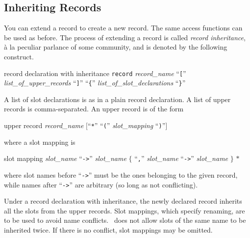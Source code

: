 \documentclass[a4paper]{memoir}
\begin{document}
\subsection{Inheriting Records}\label{sec:p2-record-inheritance}

You can extend a record to create a new record.
The same access functions can be used as before.
The process of extending a record is called
{\em record inheritance},
{\` a} la peculiar parlance of some community, and
is denoted by the following construct.

\begin{bsyntax} record declaration with inheritance  \Hline
\texttt{record} \textit{record\_name} ``\texttt{[}'' \textit{list\_of\_upper\_records} ``\texttt{]}'' ``\texttt{\{}'' \textit{list\_of\_slot\_declarations} ``\texttt{\}}''
\end{bsyntax}

A list of slot declarations is as in a plain record declaration.
A list of upper records is comma-separated. An upper record is of
the form

\begin{bsyntax} upper record \Hline
\textit{record\_name} $[$``\texttt{*}'' ``\texttt{(}'' \textit{slot\_mapping} ``\texttt{)}''$]$
\end{bsyntax}

where a slot mapping is

\begin{bsyntax} slot mapping \Hline
\textit{slot\_name} ``\texttt{->}'' \textit{slot\_name} $\{$ ``\texttt{,}'' \textit{slot\_name} ``\texttt{->}'' \textit{slot\_name} $\}$ $*$
\end{bsyntax}

where slot names before ``\verb|->|'' must be the ones belonging to the
given record, while names after ``\verb|->|'' are arbitrary (so long as
not conflicting).

Under a record declaration with inheritance,
the newly declared record inherits all the slots from
the upper records. Slot mappings, which specify renaming,
are to be used to avoid name conflicts.
\cafeobj~does not allow slots of the same name to be inherited
twice. If there is no conflict, slot mappings may be omitted.
\end{document}
